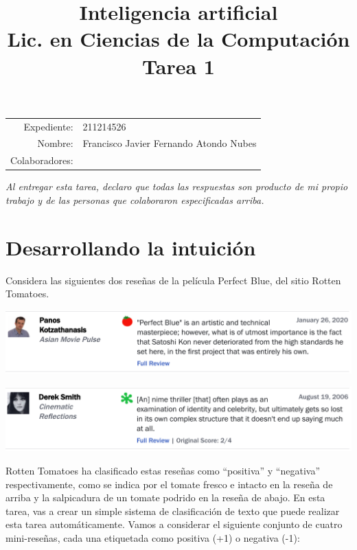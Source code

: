 \documentclass[11pt,letterpaper]{article}
\title{%
  \bfseries
  Inteligencia artificial\\%
  Lic. en Ciencias de la Computación\\%
  Tarea 1
}
\date{}
\begin{document}
\maketitle

\vspace{-2.5cm}
\begin{center}
  \begin{tabular}{rl}
    Expediente: & 211214526 \\
    Nombre: & Francisco Javier Fernando Atondo Nubes \\
    Colaboradores:
  \end{tabular}
\end{center}

{\itshape Al entregar esta tarea, declaro que todas las respuestas son
  producto de mi propio trabajo y de las personas que colaboraron
  especificadas arriba.}



\section*{Desarrollando la intuición}

  Considera las siguientes dos reseñas de la película Perfect Blue, del sitio Rotten Tomatoes.
  \newline

\begin{center}
    \includegraphics[width=0.5\linewidth]{image.png}
\end{center}

\begin{center}
    \includegraphics[width=0.5\linewidth]{image2.png}
\end{center}

Rotten Tomatoes ha clasificado estas reseñas como “positiva” y “negativa” respectivamente, como se indica por el tomate fresco e intacto en la reseña de arriba y la salpicadura de un tomate podrido en la reseña de abajo. En esta tarea, vas a crear un simple sistema de clasificación de texto que puede realizar esta tarea automáticamente. Vamos a considerar el siguiente conjunto de cuatro mini-reseñas, cada una etiquetada como positiva (+1) o negativa (-1):
\end{document}
